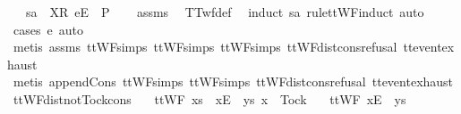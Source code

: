 \ \ \ {\isachardoublequoteopen}sa\ {\isacharat}\ {\isacharbrackleft}{\isacharbrackleft}X{\isacharbrackright}\isactrlsub R{\isacharcomma}\ {\isacharbrackleft}e{\isacharbrackright}\isactrlsub E{\isacharbrackright}\ {\isasymnotin}\ P{\isachardoublequoteclose}\isanewline
%
\isadelimproof
\ \ %
\endisadelimproof
%
\isatagproof
{}\isamarkupfalse%
\ assms\ \isamarkupfalse%
\ TTwf{\isacharunderscore}def\ \isamarkupfalse%
\ {\isacharparenleft}induct\ sa\ rule{\isacharcolon}ttWF{\isachardot}induct{\isacharcomma}\ auto{\isacharparenright}\isanewline
\ \ \ \ \isamarkupfalse%
\ {\isacharparenleft}cases\ e{\isacharcomma}\ auto{\isacharparenright}\isanewline
\ \ \isamarkupfalse%
\ {\isacharparenleft}metis\ assms{\isacharparenleft}{}{\isacharparenright}\ ttWF{\isachardot}simps{\isacharparenleft}{}{}{\isacharparenright}\ ttWF{\isachardot}simps{\isacharparenleft}{}{}{\isacharparenright}\ ttWF{\isachardot}simps{\isacharparenleft}{}{\isacharparenright}\ ttWF{\isacharunderscore}dist{\isacharunderscore}cons{\isacharunderscore}refusal\ ttevent{\isachardot}exhaust{\isacharparenright}\isanewline
\ \ \isamarkupfalse%
\ {\isacharparenleft}metis\ append{\isacharunderscore}Cons\ ttWF{\isachardot}simps{\isacharparenleft}{}{}{\isacharparenright}\ ttWF{\isachardot}simps{\isacharparenleft}{}{}{\isacharparenright}\ ttWF{\isacharunderscore}dist{\isacharunderscore}cons{\isacharunderscore}refusal\ ttevent{\isachardot}exhaust{\isacharparenright}%
\endisatagproof
{\isafoldproof}%
%
\isadelimproof
\isanewline
%
\endisadelimproof
\isanewline
{}\isamarkupfalse%
\ ttWF{\isacharunderscore}dist{\isacharunderscore}notTock{\isacharunderscore}cons{\isacharcolon}\isanewline
\ \ \ {\isachardoublequoteopen}ttWF\ {\isacharparenleft}xs\ {\isacharat}\ {\isacharparenleft}{\isacharbrackleft}{\isacharbrackleft}x{\isacharbrackright}\isactrlsub E{\isacharbrackright}\ {\isacharat}\ ys{\isacharparenright}{\isacharparenright}{\isachardoublequoteclose}\ {\isachardoublequoteopen}x\ {\isasymnoteq}\ Tock{\isachardoublequoteclose}\isanewline
\ \ \ {\isachardoublequoteopen}ttWF\ {\isacharparenleft}{\isacharbrackleft}{\isacharbrackleft}x{\isacharbrackright}\isactrlsub E{\isacharbrackright}\ {\isacharat}\ ys{\isacharparenright}{\isachardoublequoteclose}\isanewline
%
\isadelimproof
\ \ %
\endisadelimproof
%
\isatagproof
{}\isamarkupfalse%
